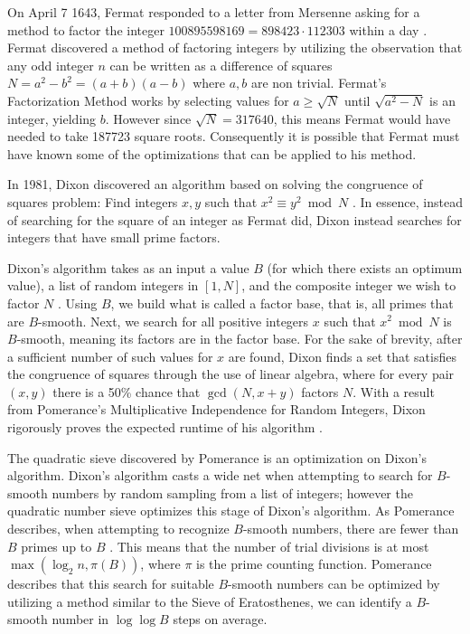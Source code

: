 \documentclass[12pt]{amsart}
\theoremstyle{definition}
\begin{document}
On April 7 1643, Fermat responded to a letter from Mersenne asking for a method to factor the integer $100895598169=898423\cdot 112303$ within a day \cite{Shiu}. Fermat discovered a method of factoring integers by utilizing the observation that any odd integer $n$ can be written as a difference of squares $N=a^2-b^2=(a+b)(a-b)$ where $a,b$ are non trivial. Fermat's Factorization Method works by selecting values for $a\geq\sqrt{N}$ until $\sqrt{a^2-N}$ is an integer, yielding $b$. However since
$\sqrt{N}=317640$, this means Fermat would have needed to take 187723 square roots. Consequently it is possible that Fermat must have known some of the optimizations that can be applied to his method.


In 1981, Dixon discovered an algorithm based on solving the congruence of squares problem: Find integers $x,y$ such that $x^2\equiv y^2 \bmod N$ \cite{Dixon}. In essence, instead of searching for the square of an integer as Fermat did, Dixon instead searches for integers that have small prime factors. 

Dixon's algorithm takes as an input a value $B$ (for which there exists an optimum value), a list of random integers in $[1,N]$, and the composite integer we wish to factor $N$ \cite{Dixon}. Using $B$, we build what is called a factor base, that is, all primes that are $B$-smooth. Next, we search for all positive integers $x$ such that $x^2 \bmod N$ is $B$-smooth, meaning its factors are in the factor base. For the sake of brevity, after a sufficient number of such values for $x$ are found, Dixon finds a set that satisfies the congruence of squares through the use of linear algebra, where for every pair $(x,y)$ there is a 50\% chance that $\gcd(N, x+y)$ factors $N$. With a result from Pomerance's Multiplicative Independence for Random Integers, Dixon rigorously proves the expected runtime of his algorithm \cite{Granville}.

The quadratic sieve discovered by Pomerance is an optimization on Dixon's algorithm. Dixon's algorithm casts a wide net when attempting to search for $B$-smooth numbers by random sampling from a list of integers; however the quadratic number sieve optimizes this stage of Dixon's algorithm. As Pomerance describes, when attempting to recognize $B$-smooth numbers, there are fewer than $B$ primes up to $B$ \cite{Pomerance1}. This means that the number of trial divisions is at most $\max(\log_2{n}, \pi(B))$, where $\pi$ is the prime counting function. Pomerance describes that this search for suitable $B$-smooth numbers can be optimized by utilizing a method similar to the Sieve of Eratosthenes, we can identify a $B$-smooth number in $\log\log B$ steps on average.
\end{document}
